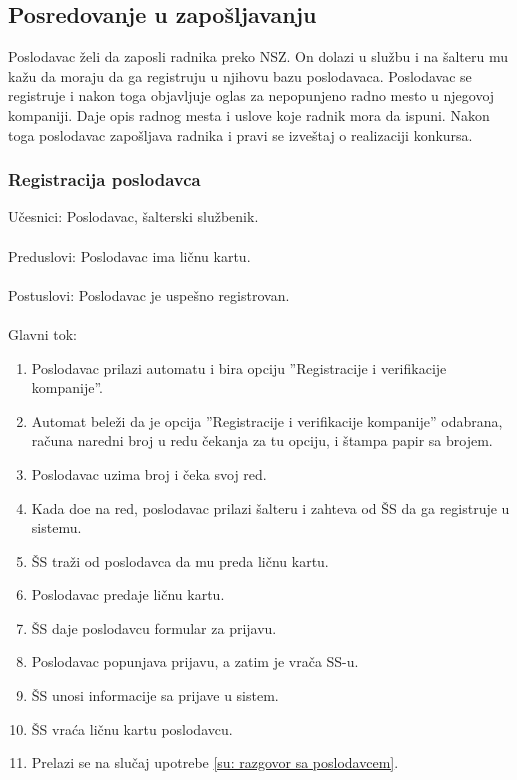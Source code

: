 \subsection{Posredovanje u zapo\v sljavanju}

Poslodavac \v zeli da zaposli radnika preko NSZ. On dolazi u slu\v zbu i na \v salteru mu ka\v zu da moraju da ga registruju u njihovu bazu poslodavaca. Poslodavac se registruje i nakon toga objavljuje oglas za nepopunjeno radno mesto u njegovoj kompaniji. Daje opis radnog mesta i uslove koje radnik mora da ispuni. Nakon toga poslodavac zapo\v sljava radnika i pravi se izve\v staj o realizaciji konkursa. 


\subsubsection{Registracija poslodavca}

\noindent Učesnici: Poslodavac, šalterski službenik.
\\
\\ Preduslovi: Poslodavac ima ličnu kartu.
\\
\\ Postuslovi: Poslodavac je uspešno registrovan.
\\
\\ Glavni tok:
\begin{enumerate}
\item Poslodavac prilazi automatu i bira opciju ''Registracije i verifikacije kompanije''.
	\item Automat bele\v zi da je opcija ''Registracije i verifikacije kompanije'' odabrana, ra\v cuna naredni broj u redu \v cekanja za tu opciju, i \v stampa papir sa brojem.
	\item Poslodavac uzima broj i \v ceka svoj red.
	\item Kada do\dj e na red, poslodavac prilazi \v salteru i zahteva od \v SS da ga registruje u sistemu.
	\item \v SS tra\v zi od poslodavca da mu preda li\v cnu kartu.
	\item Poslodavac predaje ličnu kartu. 
	\item \v SS daje poslodavcu formular za prijavu.
    \item Poslodavac popunjava prijavu, a zatim je vra\v ca SS-u.
	\item \v SS unosi informacije sa prijave u sistem.
	\item \v SS vra\' ca ličnu kartu poslodavcu.
	\item Prelazi se na slu\v caj upotrebe \ref{su: razgovor sa poslodavcem}.
\end{enumerate}



